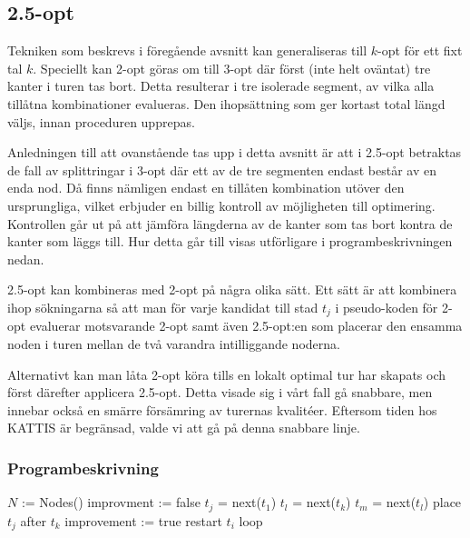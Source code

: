 \documentclass[a4paper,12pt]{article}
\renewcommand{\*}{\ensuremath{\cdot}}
\begin{document}
\subsection{2.5-opt} 


Tekniken som beskrevs i föregående avsnitt kan generaliseras till $k$-opt för
ett fixt tal $k$. Speciellt kan 2-opt göras om till 3-opt där först (inte helt
oväntat) tre kanter i turen tas bort. Detta resulterar i tre isolerade segment,
av vilka alla tillåtna kombinationer evalueras. Den ihopsättning som ger kortast
total längd väljs, innan proceduren upprepas.

Anledningen till att ovanstående tas upp i detta avsnitt är att i 2.5-opt
betraktas de fall av splittringar i 3-opt där ett av de tre segmenten endast
består av en enda nod. Då finns nämligen endast en tillåten kombination utöver
den ursprungliga, vilket erbjuder en billig kontroll av möjligheten till
optimering. Kontrollen går ut på att jämföra längderna av de kanter som tas bort
kontra de kanter som läggs till. Hur detta går till visas utförligare i
programbeskrivningen nedan.

2.5-opt kan kombineras med 2-opt på några olika sätt. Ett sätt är att kombinera
ihop sökningarna så att man för varje kandidat till stad $t_j$ i pseudo-koden
för 2-opt evaluerar motsvarande 2-opt samt även 2.5-opt:en som placerar den
ensamma noden i turen mellan de två varandra intilliggande noderna.

Alternativt kan man låta 2-opt köra tills en lokalt optimal tur har skapats och
först därefter applicera 2.5-opt. Detta visade sig i vårt fall gå snabbare, men
innebar också en smärre försämring av turernas kvalitéer. Eftersom tiden hos
KATTIS är begränsad, valde vi att gå på denna snabbare linje.



\subsubsection{Programbeskrivning}

\begin{algorithmic}
    \STATE $N$ := Nodes()
        \STATE improvment := false
            \STATE $t_j$ = next($t_1$)
                \STATE $t_l$ = next($t_k$)
                \STATE $t_m$ = next($t_l$)
                    \STATE place $t_j$ after $t_k$
                    \STATE improvement := true
                    \STATE restart $t_i$ loop
                \ENDIF
            \ENDFOR
        \ENDFOR
    \ENDWHILE
\end{algorithmic}
\end{document}

